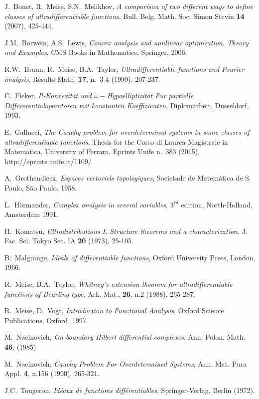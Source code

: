 \documentclass[twoside]{amsart}
\begin{document}
\begin{thebibliography}{AAAA}
 J.~Bonet, R.~Meise, S.N.~Melikhov,
{\em A comparison of two different ways to define classes of
ultradifferentiable functions}, Bull. Belg. Math. Soc. Simon Stevin {\bf 14} 
(2007),
425-444.

J.M.~Borwein, A.S.~Lewis, \emph{Convex analysis
and nonlinear optimization. Theory and Examples}, CMS Books in Mathematics,
Springer, 2006.

R.W.~Braun, R.~Meise, B.A.~Taylor, \emph{Ultradifferentiable
functions and Fourier analysis}, Results Math. \textbf{17}, n.~3-4
(1990), 207-237.

C.~Fieker, \emph{P-Konvexit\"{a}t und $\omega-$Hypoelliptizit\"{a}t
F\"{u}r partielle Differerentialoperatoren mit konstanten Koeffizienten},
Diplomarbeit, D\"{u}sseldorf, 1993.

E.~Gallucci, {\em The Cauchy problem for overdetermined systems in some 
classes of
ultradifferentiable functions}, Thesis for
the Corso di Laurea Ma\-gi\-stra\-le in Matematica, University of
 Ferrara, Eprints Unife n.~383 (2015), http://eprints.unife.it/1109/

A.~Grothendieck, {\em Espaces vectoriels topologiques}, Societade de
Matem\'atica de S. Paulo, S\~ao Paulo, 1958.

L.~H\"{o}rmander, \emph{Complex analysis in several
variables}, $3^{rd}$ edition, North-Holland, Amsterdam 1991.

H.~Komatsu, \emph{Ultradistributions I. Structure
theorems and a characterization}. J. Fac. Sci. Tokyo Sec. IA \textbf{20}
(1973), 25-105.

B.~Malgrange, \emph{Ideals of differentiable functions},
Oxford University Press, London, 1966.

R.~Meise, B.A.~Taylor, \emph{Whitney's extension
theorem for ultradifferentiable functions of Beurling type}, Ark.
Mat., \textbf{26}, n.2 (1988), 265-287.

R.~Meise, D.~Vogt, {\em Introduction to Functional Analysis},
Oxford Science Publications, Oxford, 1997.

M.~Nacinovich, \emph{On boundary Hilbert differential
complexes},  Ann. Polon. Math. \textbf{46}, (1985)

M.~Nacinovich, \emph{Cauchy Problem For Overdetermined
Systems}, Ann. Mat. Pura Appl. \textbf{4}, n.156 (1990), 265-321.

J.C.~Tougeron, \emph{Id\'eaux de functions diff\'erentiables},
Springer-Verlag, Berlin (1972).

\end{thebibliography}
\end{document}
